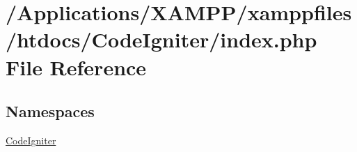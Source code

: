 \hypertarget{index_8php}{}\section{/\+Applications/\+X\+A\+M\+P\+P/xamppfiles/htdocs/\+Code\+Igniter/index.php File Reference}
\label{index_8php}
\subsection*{Namespaces}
\begin{DoxyCompactItemize}
\item 
 \mbox{\hyperlink{namespace_code_igniter}{Code\+Igniter}}
\end{DoxyCompactItemize}
